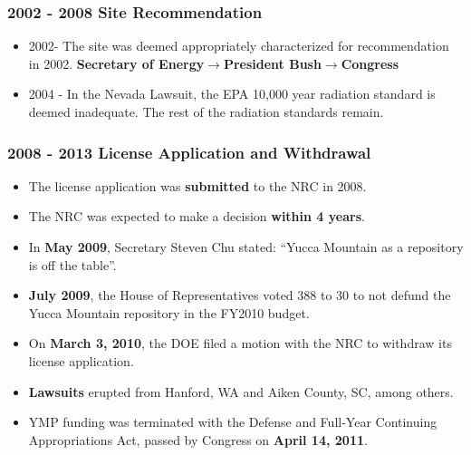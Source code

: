 \begin{frame}[ctb!]
    \frametitle{2002 - 2008 Site Recommendation}
    \begin{itemize}
      \item 2002- The site was deemed appropriately characterized for recommendation in 2002.  \textbf{Secretary of Energy}$\longrightarrow$\textbf{President 
      Bush}$\longrightarrow$\textbf{Congress}
     \item 2004 - In the Nevada Lawsuit, the EPA 10,000 year radiation standard 
       is deemed inadequate. The rest of the radiation standards remain. 
   \end{itemize}
  \end{frame}

\begin{frame}[ctb!]
    \frametitle{2008 - 2013 License Application and Withdrawal}
    \begin{itemize}
      \item The license application was \textbf{submitted} to the NRC in 2008.
      \item The NRC was expected to make a decision \textbf{within 4 years}.
      \item In \textbf{May 2009}, Secretary Steven Chu stated: ``Yucca Mountain as a 
        repository is off the table''.
      \item \textbf{July 2009}, the House of Representatives voted 388 to 30 to 
        not defund the Yucca Mountain repository in the FY2010 budget.
      \item On \textbf{March 3, 2010}, the DOE filed a motion with the NRC to 
        withdraw its license application. 
      \item \textbf{Lawsuits} erupted from Hanford, WA and Aiken County, SC, among 
        others.
      \item YMP funding was terminated with the Defense and Full-Year Continuing 
        Appropriations Act, passed by Congress on \textbf{April 14, 2011}.
    \end{itemize}
  \end{frame}



